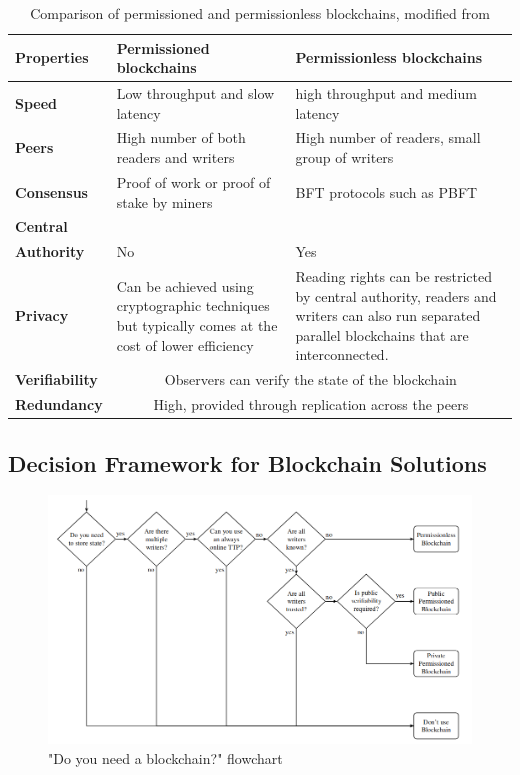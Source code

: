 \begin{table}[!h] 
    \caption{Comparison of permissioned and permissionless blockchains, modified from \citet[p.3]{wust2017you}}
    \centering
    \label{table:permvsless}
    \begin{tabularx}{\textwidth}{>{\bfseries}lXX}
        Properties & Permissioned blockchains & Permissionless blockchains\\
        \toprule
        Speed & Low throughput and slow latency & high throughput and medium latency\\\midrule
        Peers & High number of both readers and writers & High number of readers, small group of writers\\\midrule
        Consensus & Proof of work or proof of stake by miners & BFT protocols such as PBFT\\\midrule
        Central\\Authority & No & Yes\\\midrule
        Privacy & Can be achieved using cryptographic techniques but typically comes at the cost of lower efficiency & 
        Reading rights can be restricted by central authority, readers and writers can also run separated parallel blockchains that are interconnected. \\\midrule
        Verifiability & \multicolumn{2}{c}{Observers can verify the state of the blockchain} \\\midrule
        Redundancy & \multicolumn{2}{c}{High, provided through replication across the peers}
        \\\bottomrule
    \end{tabularx}
\end{table}

\subsection{Decision Framework for Blockchain Solutions}

\begin{figure}[!ht] 
    \centering    
    \includegraphics[width=1.0\textwidth]{blockchain_need}
    \caption["Do you need a blockchain?" flowchart]
        {"Do you need a blockchain?" flowchart \citep[p.3]{wust2017you}}
    \label{fig:blockchain_need}
\end{figure}


